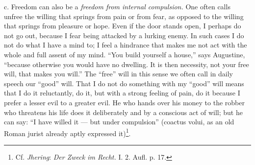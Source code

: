 \documentclass[12pt,a4paper,openany]{book}
\begin{document}
c. Freedom can also be a \textit{freedom from internal compulsion.} One often calls unfree the willing
that springs from pain or from fear, as opposed to the willing that springs from pleasure or hope. Even
if the door stands open, I perhaps do not go out, because I fear being attacked by a lurking enemy. In
such cases I do not do what I have a mind to; I feel a hindrance that makes me not act with the whole
and full assent of my mind. ``You build yourself a house,'' says Augustine, ``because otherwise you
would have no dwelling. It is then necessity, not your free will, that makes you will.'' The ``free''
will in this sense we often call in daily speech our ``good'' will. That I do not do something with my
``good'' will means that I do it reluctantly, do it, but with a strong feeling of pain, do it because I
prefer a lesser evil to a greater evil. He who hands over his money to the robber who threatens his life
does it deliberately and by a conscious act of will; but he can say: ``I have willed it --- but under
compulsion'' (coactus volui, as an old Roman jurist already aptly expressed it)\footnote[1]{Cf.
\emph{Jhering}: \textit{Der Zweck im Recht.} I. 2. Aufl. p. 17.}.
\end{document}
